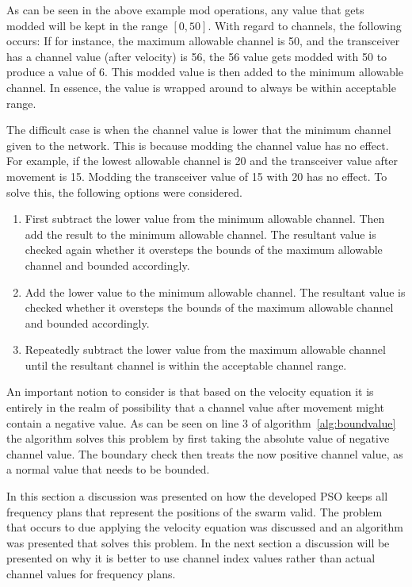 As can be seen in the above example mod operations, any value that gets modded will be kept in the range $[0,50]$. With regard to channels, the following occurs: If for instance, the maximum allowable channel is 50, and the transceiver has a channel value (after velocity) is 56, the 56 value gets modded with 50 to produce a value of 6. This modded value is then added to the minimum allowable channel. In essence, the value is wrapped around to always be within acceptable range. 

The difficult case is when the channel value is lower that the minimum channel given to the network. This is because modding the channel value has no effect. For example, if the lowest allowable channel is 20 and the transceiver value after movement is 15.
Modding the transceiver value of 15 with 20 has no effect. To solve this, the following options were considered.

\begin{enumerate}
\item First subtract the lower value from the minimum allowable channel. Then add the result to the minimum allowable channel. The resultant value is checked again whether it oversteps the bounds of the maximum allowable channel and bounded accordingly.
\item Add the lower value to the minimum allowable channel. The resultant value is checked whether it oversteps the bounds of the maximum allowable channel and bounded accordingly.
\item Repeatedly subtract the lower value from the maximum allowable channel until the resultant channel is within the acceptable channel range.
\end{enumerate}

An important notion to consider is that based on the velocity equation it is entirely in the realm of possibility that a channel value after movement might contain a negative value. As can be seen on line 3 of algorithm~\ref{alg:boundvalue} the algorithm solves this problem by first taking the absolute value of negative channel value. The boundary check then treats the now positive channel value, as a normal value that needs to be bounded.

In this section a discussion was presented on how the developed PSO keeps all frequency plans that represent the positions of the swarm valid. The problem that occurs to due applying the velocity equation was discussed and an algorithm was presented that solves this problem. In the next section a discussion will be presented on why it is better to use channel index values rather than actual channel values for frequency plans. 
